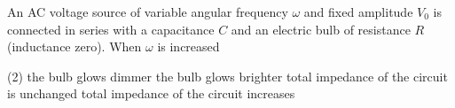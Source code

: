 
\item An AC voltage source of variable angular frequency $\omega$ and fixed amplitude $V_0$ is connected in series with a capacitance $C$ and an electric bulb of resistance $R$ (inductance zero). When $\omega$ is increased
    \begin{tasks}(2)
        \task the bulb glows dimmer
        \task the bulb glows brighter\ans
        \task total impedance of the circuit is unchanged
        \task total impedance of the circuit increases
    \end{tasks}
